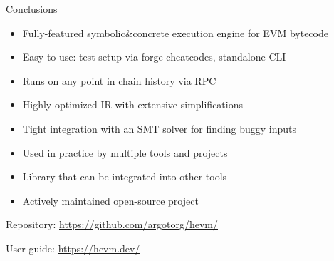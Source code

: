 \documentclass[aspectratio=169]{beamer}
\begin{document}
\begin{frame}{Conclusions}
\begin{itemize}
    \item Fully-featured symbolic\&concrete execution engine for EVM bytecode
    \item Easy-to-use: test setup via forge cheatcodes, standalone CLI
    \item Runs on any point in chain history via RPC
    \item Highly optimized IR with extensive simplifications
    \item Tight integration with an SMT solver for finding buggy inputs
    \item Used in practice by multiple tools and projects
    \item Library that can be integrated into other tools
    \item Actively maintained open-source project
\end{itemize}
\bigskip

Repository: \url{https://github.com/argotorg/hevm/}
\bigskip

User guide: \url{https://hevm.dev/}




\end{frame}
\end{document}

